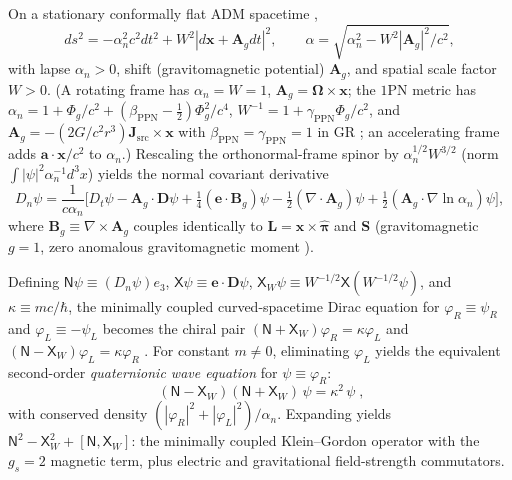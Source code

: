 \documentclass[aps,prd,onecolumn,tightenlines,nofootinbib,notitlepage,10pt,floatfix]{revtex4-2}
\theoremstyle{indentedtheorem}
\begin{document}
On a stationary conformally flat ADM spacetime \citep{Arnowitt2008Dynamics,MTW1973Gravitation},
\begin{equation}
    ds^2 = -\alpha_n^2 c^2 dt^2 + W^2|d\mathbf{x}+\mathbf{A}_g dt|^2 , \qquad \alpha = \sqrt{\alpha_n^2 - W^2|\mathbf{A}_g|^2/c^2} ,
    \label{eq:lapse_shift_metric}
\end{equation}
with lapse $\alpha_n>0$, shift (gravitomagnetic potential) $\mathbf{A}_g$, and spatial scale factor $W>0$. (A rotating frame has $\alpha_n=W=1$, $\mathbf{A}_g=\boldsymbol{\Omega}\times\mathbf{x}$; the $1$PN metric has $\alpha_n=1+\Phi_g/c^2+(\beta_\text{PPN}-\tfrac{1}{2})\Phi_g^2/c^4$, $W^{-1}=1+\gamma_\text{PPN}\Phi_g/c^2$, and $\mathbf{A}_g=-(2G/c^2r^3)\mathbf{J}_\text{src}\times\mathbf{x}$ with $\beta_\text{PPN}=\gamma_\text{PPN}=1$ in GR \citep{Will2014Confrontation}; an accelerating frame adds $\mathbf{a}\cdot\mathbf{x}/c^2$ to $\alpha_n$.) Rescaling the orthonormal-frame spinor by $\alpha_n^{1/2}W^{3/2}$ (norm $\int|\psi|^2\alpha_n^{-1}d^3x$) yields the normal covariant derivative
\begin{equation}
    D_n\psi = \frac{1}{c\alpha_n}\big[D_t\psi - \mathbf{A}_g\cdot\mathbf{D}\psi + \tfrac{1}{4}(\mathbf{e}\cdot\mathbf{B}_g)\psi - \tfrac{1}{2}(\nabla\cdot\mathbf{A}_g)\psi + \tfrac{1}{2}(\mathbf{A}_g\cdot\nabla\ln\alpha_n)\psi\big] ,
    \label{eq:normal_derivative}
\end{equation}
where $\mathbf{B}_g\equiv\nabla\times\mathbf{A}_g$ couples identically to $\mathbf{L}=\mathbf{x}\times\hat{\boldsymbol{\pi}}$ and $\mathbf{S}$ (gravitomagnetic $g=1$, zero anomalous gravitomagnetic moment \citep{KobzarevOkun1963Gravitational,HehlNi1990Inertial}).

Defining $\mathsf{N}\psi\equiv(D_n\psi)e_3$, $\mathsf{X}\psi\equiv\mathbf{e}\cdot\mathbf{D}\psi$, $\mathsf{X}_W\psi\equiv W^{-1/2}\mathsf{X}(W^{-1/2}\psi)$, and $\kappa\equiv mc/\hbar$, the minimally coupled curved-spacetime Dirac equation \citep{Dirac1928Quantum,Peskin1995Introduction} for $\varphi_R\equiv\psi_R$ and $\varphi_L\equiv-\psi_L$ becomes the chiral pair $(\mathsf{N}+\mathsf{X}_W)\varphi_R=\kappa\varphi_L$ and $(\mathsf{N}-\mathsf{X}_W)\varphi_L=\kappa\varphi_R$ \citep{HutchisonWavefn2026}. For constant $m\neq 0$, eliminating $\varphi_L$ yields the equivalent second-order \emph{quaternionic wave equation} for $\psi\equiv\varphi_R$:
\begin{equation}
    \boxed{\; (\mathsf{N}-\mathsf{X}_W)(\mathsf{N}+\mathsf{X}_W)\,\psi = \kappa^2\,\psi \;} ,
    \label{eq:pure_form}
\end{equation}
with conserved density $(|\varphi_R|^2+|\varphi_L|^2)/\alpha_n$. Expanding yields $\mathsf{N}^2-\mathsf{X}_W^2+[\mathsf{N},\mathsf{X}_W]$: the minimally coupled Klein--Gordon operator \citep{Klein1926Quantum,Gordon1926Compton} with the $g_s=2$ magnetic term, plus electric and gravitational field-strength commutators.
\end{document}
